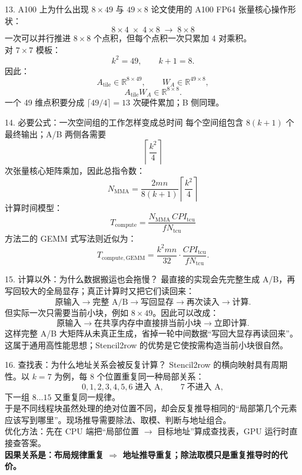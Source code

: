 \documentclass[aspectratio=169,11pt]{beamer}
\newcommand{\R}{\mathbb{R}}
\newcommand{\smallnote}[1]{\vspace{0.25em}{\scriptsize\color{gray}#1}}
\begin{document}
\begin{frame}{13. A100 上为什么出现 \(8\times49\) 与 \(49\times8\)}
\small
论文使用的 A100 FP64 张量核心操作形状：
\[
\boxed{8\times4\;\times\;4\times8\;\longrightarrow\;8\times8}
\]
一次可以并行推进 \(8\times8\) 个点积，但每个点积一次只累加 4 对乘积。\\[0.6em]
对 \(7\times7\) 模板：
\[
k^2=49,\qquad k+1=8.
\]
因此：
\[
A_{\text{tile}}\in\R^{8\times49},\qquad W_A\in\R^{49\times8},
\]
\[
A_{\text{tile}}W_A\in\R^{8\times8}.
\]
一个 49 维点积要分成 \(\lceil49/4\rceil=13\) 次硬件累加；B 侧同理。
\end{frame}

\begin{frame}{14. 必要公式：一次空间组的工作怎样变成总时间}
\small
每个空间组包含 \(8(k+1)\) 个最终输出；A/B 两侧各需要
\[
\left\lceil\frac{k^2}{4}\right\rceil
\]
次张量核心矩阵乘加，因此总指令数：
\[
\boxed{
N_{\mathrm{MMA}}
=
\frac{2mn}{8(k+1)}
\left\lceil\frac{k^2}{4}\right\rceil
}
\]
计算时间模型：
\[
\boxed{
T_{\mathrm{compute}}
=
\frac{N_{\mathrm{MMA}}\,CPI_{\mathrm{tcu}}}{fN_{\mathrm{tcu}}}
}
\]
方法二的 GEMM 式写法则近似为：
\[
T_{\mathrm{compute,GEMM}}
=
\frac{k^2mn}{32}\cdot\frac{CPI_{\mathrm{tcu}}}{fN_{\mathrm{tcu}}}.
\]
\smallnote{对应论文式 (13)--(15)。}
\end{frame}

\begin{frame}{15. 计算以外：为什么数据搬运也会拖慢？}
\small
最直接的实现会先完整生成 A/B，再写回较大的全局显存；真正计算时又把它们读回来：
\[
\text{原输入}\rightarrow\text{完整 A/B}\rightarrow\text{写回显存}\rightarrow\text{再次读入}\rightarrow\text{计算}.
\]
但实际一次只需要当前小块，例如 \(8\times49\)。因此可以改成：
\[
\text{原输入}\rightarrow\text{在共享内存中直接排当前小块}\rightarrow\text{立即计算}.
\]
这样完整 A/B 大矩阵从未真正生成，省掉一轮中间数据“写回大显存再读回来”。\\[0.6em]
这属于通用高性能思想；Stencil2row 的优势是它使按需构造当前小块很自然。
\end{frame}

\begin{frame}{16. 查找表：为什么地址关系会被反复计算？}
\small
Stencil2row 的横向映射具有周期性。以 \(k=7\) 为例，每 8 个位置重复同一种局部关系：
\[
0,1,2,3,4,5,6\;\text{进入 A},\qquad 7\;\text{不进入 A},
\]
下一组 \(8\ldots15\) 又重复同一规律。\\[0.6em]
于是不同线程块虽然处理的绝对位置不同，却会反复推导相同的“局部第几个元素应该写到哪里”。现场推导需要除法、取模、判断与地址组合。\\[0.6em]
优化方法：先在 CPU 端把“局部位置 \(\rightarrow\) 目标地址”算成查找表，GPU 运行时直接查答案。\\[0.6em]
\textbf{因果关系是：布局规律重复 \(\Rightarrow\) 地址推导重复；除法取模只是重复推导时的代价。}
\end{frame}
\end{document}
